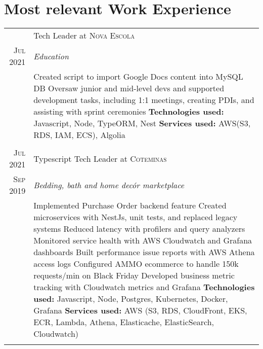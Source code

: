 \documentclass[a4paper,10pt]{article}
\begin{document}
\section{Most relevant Work Experience}
\begin{tabular}{r|p{11cm}}

\textsc & Tech Leader at \textsc{Nova Escola} \\\textsc{Jul 2021}&\emph{Education }\\&\footnotesize{ 
 Created script to import Google Docs content into MySQL DB \newline
 Oversaw junior and mid-level devs and supported development tasks, including 1:1 meetings, creating PDIs, and assisting with sprint ceremonies \newline
\textbf{Technologies used:} Javascript, Node, TypeORM, Nest \newline
\textbf{Services used:} AWS(S3, RDS, IAM, ECS), Algolia}\\\multicolumn{2}{c}{} \\


\textsc{Jul 2021} & Typescript Tech Leader at \textsc{Coteminas} \\\textsc{Sep 2019}&\emph{Bedding, bath and home decór marketplace }\\&\footnotesize{ 
 Implemented Purchase Order backend feature \newline
 Created microservices with NestJs, unit tests, and replaced legacy systems \newline
 Reduced latency with profilers and query analyzers \newline
 Monitored service health with AWS Cloudwatch and Grafana dashboards \newline
 Built performance issue reports with AWS Athena access logs \newline
 Configured AMMO ecommerce to handle 150k requests/min on Black Friday \newline
 Developed business metric tracking with Cloudwatch metrics and Grafana \newline 
\textbf{Technologies used:} Javascript, Node, Postgres, Kubernetes, Docker, Grafana \newline
\textbf{Services used:} AWS (S3, RDS, CloudFront, EKS, ECR, Lambda, Athena, Elasticache, ElasticSearch, Cloudwatch)}\\\multicolumn{2}{c}{} \\



\end{tabular}
\end{document}
